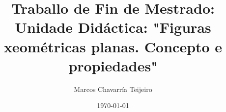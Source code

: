 \documentclass[a4paper,11pt,twoside,openright]{book}
\title{Traballo de Fin de Mestrado: Unidade Didáctica: "Figuras xeométricas planas. Concepto e propiedades"}
\author{Marcos Chavarría Teijeiro}
\date{\today}
\begin{document}
    \renewcommand{\listtablename}{Índice de táboas}
    \renewcommand{\tablename}{Táboa}
    \renewcommand{\contentsname}{Índice xeral}
    \renewcommand{\bibsection}{\section{\bibname}}
    \renewcommand{\bibname}{Referencias bibliográficas}
    \renewcommand{\BBAA}{e}  %
    \renewcommand{\BBAB}{e}  %
    \renewcommand{\BAnd}{e}  %
     \renewcommand{\BOthers}{e cols}

        

        \mainmatter
        \tableofcontents
        \listoffigures

        
        
        
        
        


        \appendix
        
\end{document}
